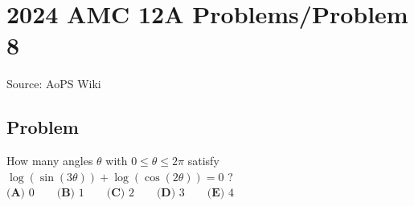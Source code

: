 \documentclass[12pt]{article}
\begin{document}
\section*{{2024 AMC 12A Problems/Problem 8}}
Source: AoPS Wiki

\subsection*{Problem}
How many angles $\theta$ with $0\le\theta\le2\pi$ satisfy $\log(\sin(3\theta))+\log(\cos(2\theta))=0$ ? $\textbf{(A) }0 \qquad \textbf{(B) }1 \qquad \textbf{(C) }2 \qquad \textbf{(D) }3 \qquad \textbf{(E) }4 \qquad$
\end{document}
